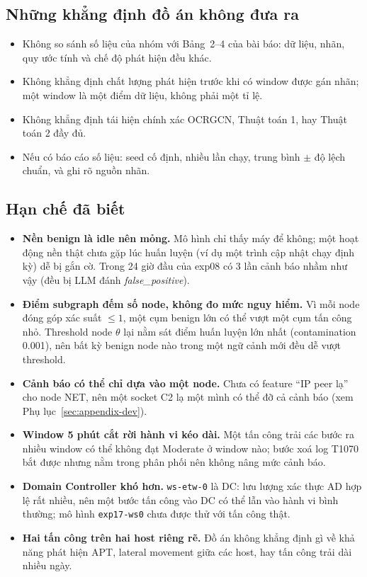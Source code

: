 \subsection{Những khẳng định đồ án không đưa ra}
\label{sec:claims}
\begin{itemize}
    \item Không so sánh số liệu của nhóm với Bảng~2--4 của bài báo: dữ liệu, nhãn, quy ước tính và chế độ phát hiện đều khác.
    \item Không khẳng định chất lượng phát hiện trước khi có window được gán nhãn; một window là một điểm dữ liệu, không phải một tỉ lệ.
    \item Không khẳng định tái hiện chính xác OCRGCN, Thuật toán 1, hay Thuật toán 2 đầy đủ.
    \item Nếu có báo cáo số liệu: seed cố định, nhiều lần chạy, trung bình $\pm$ độ lệch chuẩn, và ghi rõ nguồn nhãn.
\end{itemize}

\subsection{Hạn chế đã biết}
\label{sec:known-limits}
\begin{itemize}
    \item \textbf{Nền benign là idle nên mỏng.} Mô hình chỉ thấy máy để không; một hoạt động nền thật chưa gặp lúc huấn luyện (ví dụ một trình cập nhật chạy định kỳ) dễ bị gắn cờ. Trong 24 giờ đầu của exp08 có 3 lần cảnh báo nhầm như vậy (đều bị LLM đánh \emph{false\_positive}).
    \item \textbf{Điểm subgraph đếm số node, không đo mức nguy hiểm.} Vì mỗi node đóng góp xác suất $\le 1$, một cụm benign lớn có thể vượt một cụm tấn công nhỏ. Threshold node $\theta$ lại nằm sát điểm huấn luyện lớn nhất (contamination 0.001), nên bất kỳ benign node nào trong một ngữ cảnh mới đều dễ vượt threshold.
    \item \textbf{Cảnh báo có thể chỉ dựa vào một node.} Chưa có feature ``IP peer lạ'' cho node NET, nên một socket C2 lạ một mình có thể đỡ cả cảnh báo (xem Phụ lục~\ref{sec:appendix-dev}).
    \item \textbf{Window 5 phút cắt rời hành vi kéo dài.} Một tấn công trải các bước ra nhiều window có thể không đạt Moderate ở window nào; bước xoá log T1070 bắt được nhưng nằm trong phân phối nên không nâng mức cảnh báo.
    \item \textbf{Domain Controller khó hơn.} \texttt{ws-etw-0} là DC: lưu lượng xác thực AD hợp lệ rất nhiều, nên một bước tấn công vào DC có thể lẫn vào hành vi bình thường; mô hình \texttt{exp17-ws0} chưa được thử với tấn công thật.
    \item \textbf{Hai tấn công trên hai host riêng rẽ.} Đồ án không khẳng định gì về khả năng phát hiện APT, lateral movement giữa các host, hay tấn công trải dài nhiều ngày.
\end{itemize}

